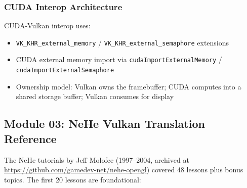 \documentclass[11pt,letterpaper]{article}
\begin{document}
\subsubsection{CUDA Interop Architecture}

CUDA-Vulkan interop uses:
\begin{itemize}
\item \texttt{VK\_KHR\_external\_memory} / \texttt{VK\_KHR\_external\_semaphore} extensions
\item CUDA external memory import via \texttt{cudaImportExternalMemory} / \texttt{cudaImportExternalSemaphore}
\item Ownership model: Vulkan owns the framebuffer; CUDA computes into a shared storage buffer; Vulkan consumes for display
\end{itemize}

\subsection{Module 03: NeHe Vulkan Translation Reference}

The NeHe tutorials by Jeff Molofee (1997--2004, archived at \url{https://github.com/gamedev-net/nehe-opengl}) covered 48 lessons plus bonus topics. The first 20 lessons are foundational:
\end{document}
